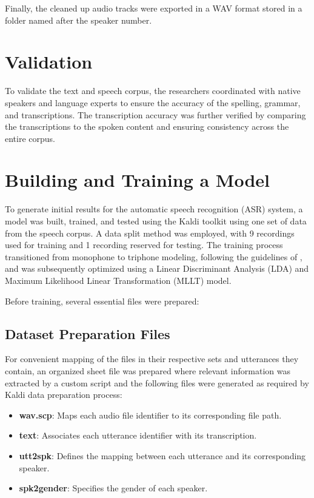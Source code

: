 Finally, the cleaned up audio tracks were exported in a WAV format stored in a folder named after the speaker number.

\section{Validation}

To validate the text and speech corpus, the researchers coordinated with native speakers and language experts to ensure the accuracy of the spelling, grammar, and transcriptions. The transcription accuracy was further verified by comparing the transcriptions to the spoken content and ensuring consistency across the entire corpus.

\section{Building and Training a Model}

To generate initial results for the automatic speech recognition (ASR) system, a model was built, trained, and tested using the Kaldi toolkit using one set of data from the speech corpus. A data split method was employed, with 9 recordings used for training and 1 recording reserved for testing. The training process transitioned from monophone to triphone modeling, following the guidelines of , and was subsequently optimized using a Linear Discriminant Analysis (LDA) and Maximum Likelihood Linear Transformation (MLLT) model.

Before training, several essential files were prepared:

\subsection{Dataset Preparation Files}

For convenient mapping of the files in their respective sets and utterances they contain, an organized sheet file was prepared where relevant information was extracted by a custom script and the following files were generated as required by Kaldi data preparation process:

\begin{itemize}
    \item \textbf{wav.scp}: Maps each audio file identifier to its corresponding file path.
    \item \textbf{text}: Associates each utterance identifier with its transcription.
    \item \textbf{utt2spk}: Defines the mapping between each utterance and its corresponding speaker.
    \item \textbf{spk2gender}: Specifies the gender of each speaker.
\end{itemize}

